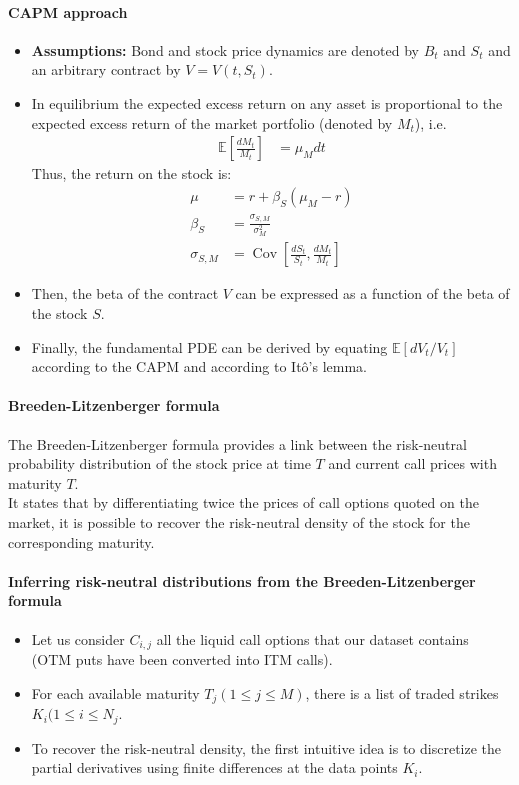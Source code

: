 \documentclass[a4paper,landscape,7pt,fleqn]{scrartcl}
\renewcommand{\emph}[1]{\textbf{#1}}
\DeclareMathOperator{\Cov}{Cov}				%
\begin{document}
\begin{multicols*}{3}
\paragraph{CAPM approach}
\begin{itemize}
\item \emph{Assumptions:} Bond and stock price dynamics are denoted by $B_t$ and $S_t$ and an arbitrary contract by $V = V(t,S_t)$.
\item In equilibrium the expected excess return on any asset is proportional to the expected excess return of the market portfolio (denoted by $M_t$), i.e.
\begin{align*}
\mathbb{E} \left[ \frac{dM_t}{M_t} \right] &= \mu_M dt
\end{align*}
Thus, the return on the stock is:
\begin{align*}
\mu &= r + \beta_S (\mu_M - r) \\
\beta_S &= \frac{\sigma_{S,M}}{\sigma^2_M} \\
\sigma_{S,M} &= \Cov \left[ \frac{dS_t}{S_t}, \frac{dM_t}{M_t} \right]
\end{align*}
\item Then, the beta of the contract $V$ can be expressed as a function of the beta of the stock $S$.
\item Finally, the fundamental PDE can be derived by equating $\mathbb{E} \left[ dV_t / V_t \right]$ according to the CAPM and according to Itô's lemma.
\end{itemize}

\paragraph{Breeden-Litzenberger formula}
The Breeden-Litzenberger formula provides a link between the risk-neutral probability distribution of the stock price at time $T$ and current call prices with maturity $T$. \\
It states that by differentiating twice the prices of call options quoted on the market, it is possible to recover the risk-neutral density of the stock for the corresponding maturity.

\paragraph{Inferring risk-neutral distributions from the Breeden-Litzenberger formula}
\begin{itemize}
\item Let us consider $C_{i,j}$ all the liquid call options that our dataset contains (OTM puts have been converted into ITM calls).
\item For each available maturity $T_j (1 \leq j \leq M)$, there is a list of traded strikes $K_i (1 \leq i \leq N_j$.
\item To recover the risk-neutral density, the first intuitive idea is to discretize the partial derivatives using finite differences at the data points $K_i$.
\end{itemize}


\end{multicols*}
\end{document}
